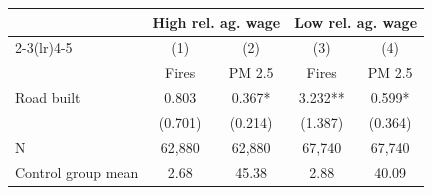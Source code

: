 {
\def\sym#1{\ifmmode^{#1}\else\(^{#1}\)\fi}
\begin{tabular}{l*{4}{c}}
\hline\hline
                         &\multicolumn{2}{c}{High rel. ag. wage}&\multicolumn{2}{c}{Low rel. ag. wage}\\\cmidrule(lr){2-3}\cmidrule(lr){4-5}
                         &\multicolumn{1}{c}{(1)}&\multicolumn{1}{c}{(2)}&\multicolumn{1}{c}{(3)}&\multicolumn{1}{c}{(4)}\\
                         &\multicolumn{1}{c}{Fires}&\multicolumn{1}{c}{PM 2.5}&\multicolumn{1}{c}{Fires}&\multicolumn{1}{c}{PM 2.5}\\
\hline
Road built               &       0.803   &       0.367*  &       3.232** &       0.599*  \\
                         &     (0.701)   &     (0.214)   &     (1.387)   &     (0.364)   \\
\hline
N                        &      62,880   &      62,880   &      67,740   &      67,740   \\
Control group mean       &        2.68   &       45.38   &        2.88   &       40.09   \\
\hline\hline
\end{tabular}
}
